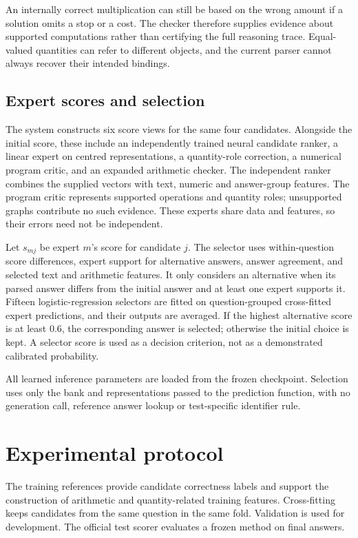 \documentclass[10pt]{article}
\begin{document}
An internally correct multiplication can still be based on the wrong amount if a solution omits a stop or a cost. The checker therefore supplies evidence about supported computations rather than certifying the full reasoning trace. Equal-valued quantities can refer to different objects, and the current parser cannot always recover their intended bindings.
\subsection{Expert scores and selection}
The system constructs six score views for the same four candidates. Alongside the initial score, these include an independently trained neural candidate ranker, a linear expert on centred representations, a quantity-role correction, a numerical program critic, and an expanded arithmetic checker. The independent ranker combines the supplied vectors with text, numeric and answer-group features. The program critic represents supported operations and quantity roles; unsupported graphs contribute no such evidence. These experts share data and features, so their errors need not be independent.

Let $s_{mj}$ be expert $m$'s score for candidate $j$. The selector uses within-question score differences, expert support for alternative answers, answer agreement, and selected text and arithmetic features. It only considers an alternative when its parsed answer differs from the initial answer and at least one expert supports it. Fifteen logistic-regression selectors are fitted on question-grouped cross-fitted expert predictions, and their outputs are averaged. If the highest alternative score is at least 0.6, the corresponding answer is selected; otherwise the initial choice is kept. A selector score is used as a decision criterion, not as a demonstrated calibrated probability.

All learned inference parameters are loaded from the frozen checkpoint. Selection uses only the bank and representations passed to the prediction function, with no generation call, reference answer lookup or test-specific identifier rule.
\section{Experimental protocol}
The training references provide candidate correctness labels and support the construction of arithmetic and quantity-related training features. Cross-fitting keeps candidates from the same question in the same fold. Validation is used for development. The official test scorer evaluates a frozen method on final answers.
\end{document}
